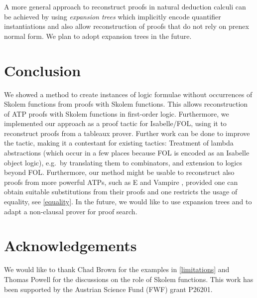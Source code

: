 \documentclass[]{article}
\begin{document}
A more general approach to reconstruct proofs in natural deduction
calculi can be achieved by using \emph{expansion trees}
\citep{miller1983-phd, pfenning1987-phd} which implicitly encode
quantifier instantiations and also allow reconstruction of proofs that
do not rely on prenex normal form. We plan to adopt expansion trees in
the future.

\section{Conclusion}\label{conclusion}

We showed a method to create instances of logic formulae without
occurrences of Skolem functions from proofs with Skolem functions. This
allows reconstruction of ATP proofs with Skolem functions in first-order
logic. Furthermore, we implemented our approach as a proof tactic for
Isabelle/FOL, using it to reconstruct proofs from a tableaux prover.
Further work can be done to improve the tactic, making it a contestant
for existing tactics: Treatment of lambda abstractions (which occur in a
few places because FOL is encoded as an Isabelle object logic), e.g.~by
translating them to combinators, and extension to logics beyond FOL.
Furthermore, our method might be usable to reconstruct also proofs from
more powerful ATPs, such as E \citep{schulz2013-e} and Vampire
\citep{kovacs2013-vampire}, provided one can obtain suitable
substitutions from their proofs and one restricts the usage of equality,
see \autoref{equality}. In the future, we would like to use expansion
trees and to adapt a non-clausal prover \citep{otten2011-nonclausal} for
proof search.

\section*{Acknowledgements}\label{acknowledgements}

We would like to thank Chad Brown for the examples in
\autoref{limitations} and Thomas Powell for the discussions on the role
of Skolem functions. This work has been supported by the Austrian
Science Fund (FWF) grant P26201.


\end{document}
